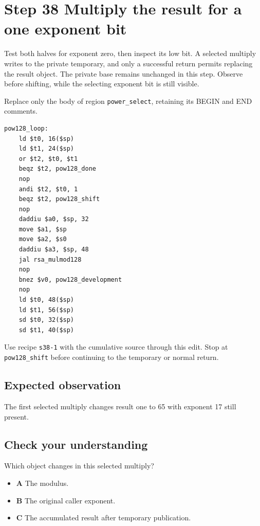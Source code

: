 \section{Step 38 Multiply the result for a one exponent bit}\label{rsa-s38}

Test both halves for exponent zero, then inspect its low bit. A selected multiply writes to the private temporary, and only a successful return permits replacing the result object. The private base remains unchanged in this step. Observe before shifting, while the selecting exponent bit is still visible.

Replace only the body of region \texttt{power\_select}, retaining its BEGIN and END comments.

\begin{verbatim}
pow128_loop:
    ld $t0, 16($sp)
    ld $t1, 24($sp)
    or $t2, $t0, $t1
    beqz $t2, pow128_done
    nop
    andi $t2, $t0, 1
    beqz $t2, pow128_shift
    nop
    daddiu $a0, $sp, 32
    move $a1, $sp
    move $a2, $s0
    daddiu $a3, $sp, 48
    jal rsa_mulmod128
    nop
    bnez $v0, pow128_development
    nop
    ld $t0, 48($sp)
    ld $t1, 56($sp)
    sd $t0, 32($sp)
    sd $t1, 40($sp)
\end{verbatim}

Use recipe \texttt{s38-1} with the cumulative source through this edit. Stop at \texttt{pow128\_shift} before continuing to the temporary or normal return.

\subsection{Expected observation}
The first selected multiply changes result one to 65 with exponent 17 still present.

\subsection{Check your understanding}
Which object changes in this selected multiply?

\begin{itemize}
  \item \textbf{A} The modulus.
  \item \textbf{B} The original caller exponent.
  \item \textbf{C} The accumulated result after temporary publication.
\end{itemize}
